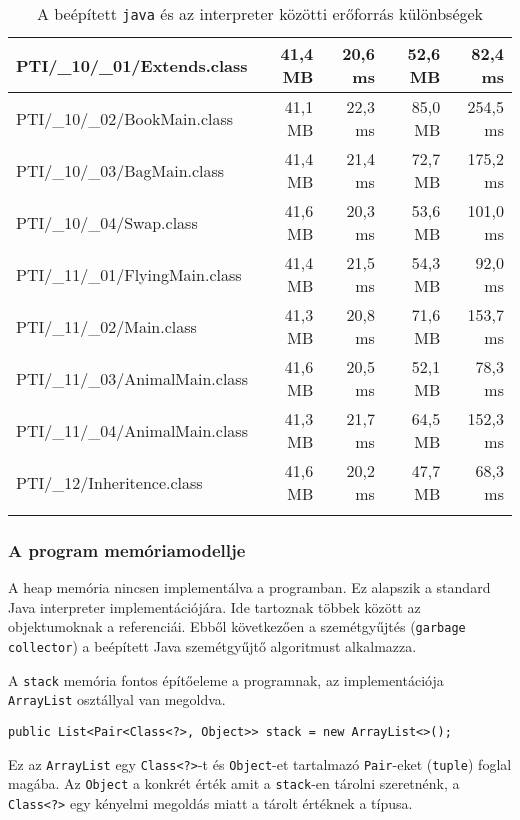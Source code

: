 \begin{center}
\begin{longtable}{ | l | r | r | r | r | }
		\hline
		PTI/\_10/\_01/Extends.class & 41,4 MB & 20,6 ms & 52,6 MB & 82,4 ms \\
		\hline
		PTI/\_10/\_02/BookMain.class & 41,1 MB & 22,3 ms & 85,0 MB & 254,5 ms \\
		\hline
		PTI/\_10/\_03/BagMain.class & 41,4 MB & 21,4 ms & 72,7 MB & 175,2 ms \\
		\hline
		PTI/\_10/\_04/Swap.class & 41,6 MB & 20,3 ms & 53,6 MB & 101,0 ms \\
		\hline
		PTI/\_11/\_01/FlyingMain.class & 41,4 MB & 21,5 ms & 54,3 MB & 92,0 ms \\
		\hline
		PTI/\_11/\_02/Main.class & 41,3 MB & 20,8 ms & 71,6 MB & 153,7 ms \\
		\hline
		PTI/\_11/\_03/AnimalMain.class & 41,6 MB & 20,5 ms & 52,1 MB & 78,3 ms \\
		\hline
		PTI/\_11/\_04/AnimalMain.class & 41,3 MB & 21,7 ms & 64,5 MB & 152,3 ms \\
		\hline
		PTI/\_12/Inheritence.class & 41,6 MB & 20,2 ms & 47,7 MB & 68,3 ms \\
		\hline

		\caption[Erőforrás különbségek]{A beépített \lstinline{java} és az interpreter közötti erőforrás különbségek}
		\label{table:resource}
	\end{longtable}
\end{center}

\subsubsection{A program memóriamodellje}

A heap memória nincsen implementálva a programban. Ez alapszik a standard Java interpreter implementációjára. Ide tartoznak többek között az objektumoknak a referenciái. Ebből következően a szemétgyűjtés (\lstinline{garbage collector}) a beépített Java szemétgyűjtő algoritmust alkalmazza.

A \lstinline{stack} memória fontos építőeleme a programnak, az implementációja \lstinline{ArrayList} osztállyal van megoldva.
\begin{verbatim}
public List<Pair<Class<?>, Object>> stack = new ArrayList<>();
\end{verbatim}
Ez az \lstinline{ArrayList} egy \lstinline{Class<?>}-t és \lstinline{Object}-et tartalmazó \lstinline{Pair}-eket (\lstinline{tuple}) foglal magába. Az \lstinline{Object} a konkrét érték amit a \lstinline{stack}-en tárolni szeretnénk, a \lstinline{Class<?>} egy kényelmi megoldás miatt a tárolt értéknek a típusa.

